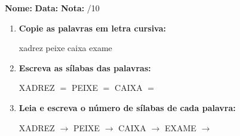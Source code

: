 \begin{exercicio}



\noindent\textbf{Nome:} \underline{\hspace{3.2cm}} \quad \textbf{Data:} \underline{\hspace{1.6cm}} \quad \textbf{Nota:} \underline{\hspace{0.9cm}}/10


\begin{enumerate}

  \item \textbf{Copie as palavras em letra cursiva:}
  \begin{center}
  xadrez \quad peixe \quad caixa \quad exame
  \end{center}
  \begin{center}
  \underline{\hspace{2.4cm}} \quad \underline{\hspace{2.4cm}} \quad \underline{\hspace{2.4cm}} \quad \underline{\hspace{2.4cm}}
  \end{center}

  \item \textbf{Escreva as sílabas das palavras:}
  \begin{center}
  XADREZ $=$ \underline{\hspace{1.5cm}} \underline{\hspace{1.5cm}} \quad PEIXE $=$ \underline{\hspace{1.5cm}} \underline{\hspace{1.5cm}} \quad CAIXA $=$ \underline{\hspace{1.5cm}} \underline{\hspace{1.5cm}}
  \end{center}

  \item \textbf{Leia e escreva o número de sílabas de cada palavra:}
  \begin{center}
  XADREZ $\rightarrow$ \underline{\hspace{0.9cm}} \quad PEIXE $\rightarrow$ \underline{\hspace{0.9cm}} \quad CAIXA $\rightarrow$ \underline{\hspace{0.9cm}} \quad EXAME $\rightarrow$ \underline{\hspace{0.9cm}}
  \end{center}


\end{enumerate}
\end{exercicio}
